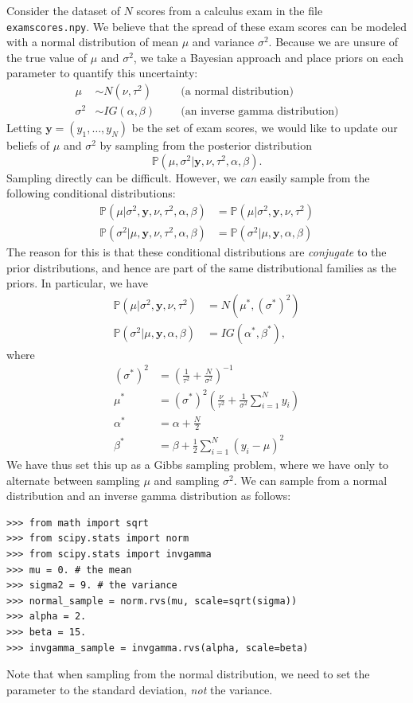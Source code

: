 Consider the dataset of $N$ scores from a calculus exam in the file \texttt{examscores.npy}.
We believe that the spread of these exam scores can be modeled with a normal distribution of mean $\mu$ and variance $\sigma^{2}$.
Because we are unsure of the true value of $\mu$ and $\sigma^2$, we take a Bayesian approach and place priors on each parameter to quantify this uncertainty:
\begin{align*}
\mu & \sim N(\nu, \tau^{2})\quad &&\text{(a normal distribution)} \\
\sigma^{2} & \sim IG(\alpha, \beta) &&\text{(an inverse gamma distribution)}
\end{align*}
Letting $\mathbf{y} = (y_1,\ldots,y_N)$ be the set of exam scores, we would like to update our beliefs of $\mu$ and $\sigma^2$ by sampling from the posterior
distribution
\begin{equation*}
\mathbb{P}(\mu, \sigma^{2} | \mathbf{y}, \nu, \tau^{2}, \alpha, \beta).
\end{equation*}
Sampling directly can be difficult. However, we \emph{can} easily sample from the following conditional distributions:
\begin{align*}
\mathbb{P}(\mu | \sigma^{2}, \mathbf{y}, \nu, \tau^{2}, \alpha, \beta) & = \mathbb{P}(\mu | \sigma^{2}, \mathbf{y}, \nu, \tau^{2})\\
\mathbb{P}(\sigma^{2} | \mu, \mathbf{y}, \nu, \tau^{2}, \alpha, \beta) & = \mathbb{P}(\sigma^{2} | \mu, \mathbf{y}, \alpha, \beta)
\end{align*}
The reason for this is that these conditional distributions are \emph{conjugate} to the prior distributions, and hence are part of the same distributional
families as the priors. In particular, we have
\begin{align*}
\mathbb{P}(\mu | \sigma^{2}, \mathbf{y}, \nu, \tau^{2}) &= N(\mu^*, (\sigma^*)^2)\\
\mathbb{P}(\sigma^{2} | \mu, \mathbf{y}, \alpha, \beta) &= IG(\alpha^*, \beta^*),
\end{align*}
where
\begin{align*}
(\sigma^*)^2 &= \left(\frac{1}{\tau^2}+\frac{N}{\sigma^2}\right)^{-1}\\
\mu^* &= (\sigma^*)^2\left(\frac{\nu}{\tau^2} + \frac{1}{\sigma^2}\sum_{i=1}^N y_i \right)\\
\alpha^* &= \alpha + \frac{N}{2}\\
\beta^* &= \beta + \frac{1}{2}\sum_{i=1}^N (y_i-\mu)^2
\end{align*}
We have thus set this up as a Gibbs sampling problem, where we have only to alternate between sampling $\mu$ and sampling $\sigma^{2}$.
We can sample from a normal distribution and an inverse gamma distribution as follows:
\begin{lstlisting}
>>> from math import sqrt
>>> from scipy.stats import norm
>>> from scipy.stats import invgamma
>>> mu = 0. # the mean
>>> sigma2 = 9. # the variance
>>> normal_sample = norm.rvs(mu, scale=sqrt(sigma))
>>> alpha = 2.
>>> beta = 15.
>>> invgamma_sample = invgamma.rvs(alpha, scale=beta)
\end{lstlisting}
Note that when sampling from the normal distribution, we need to set the  parameter to the standard deviation, \emph{not} the variance.

